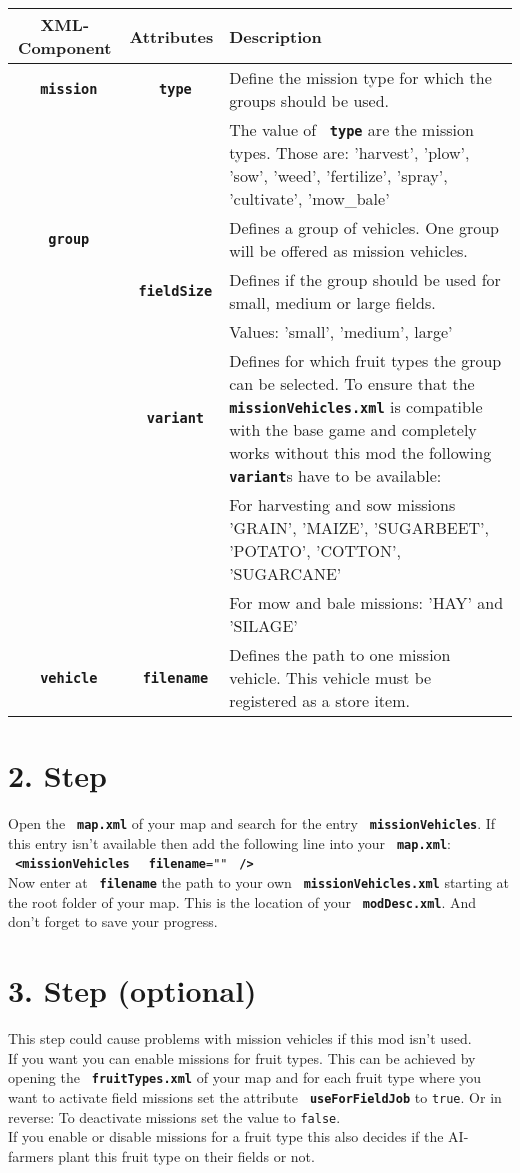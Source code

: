 \documentclass[a4paper]{scrartcl}
\newcommand{\XML}[1]{\texttt{\textbf{\color{pblue} #1}}}
\newcommand{\Attr}[1]{\texttt{\textbf{\color{pgreen} #1}}}
\newcommand{\Datei}[1]{\texttt{\textbf{\color{datei} #1}}}
\newcommand{\icon}[1]{
	\hspace{-2mm}
	\faIcon[solid]{#1}
	\hspace{-2mm}
}
\newcommand{\warning}{{\color{pred}\icon{exclamation-triangle}}}
\begin{document}
	\begin{tabular}{c|c|p{9cm}}
		\textbf{XML-Component} & \textbf{Attributes} & \textbf{Description}\\
		\hline
		\XML{mission} & \Attr{type} & Define the mission type for which the groups should be used.\\
		& & The value of \Attr{type} are the mission types. Those are: 'harvest', 'plow', 'sow', 'weed', 'fertilize', 'spray', 'cultivate', 'mow\_bale'\\
		\hline
		\XML{group} & & Defines a group of vehicles. One group will be offered as mission vehicles.\\
		\hdashline
		& \Attr{fieldSize} & Defines if the group should be used for small, medium or large fields.\\
		& & Values: 'small', 'medium', large'\\
		\hdashline
		& \Attr{variant} &
			Defines for which fruit types the group can be selected.
			To ensure that the \Datei{missionVehicles.xml} is compatible with the base game and completely works without this mod the following \XML{variant}s have to be available:\\
		& & For harvesting and sow missions 'GRAIN', 'MAIZE', 'SUGARBEET', 'POTATO', 'COTTON', 'SUGARCANE'\\
		& & For mow and bale missions: 'HAY' and 'SILAGE'\\
		\hline
		\XML{vehicle} & \Attr{filename} & Defines the path to one mission vehicle. This vehicle must be registered as a store item.
	\end{tabular}

	\section*{2. Step}
	Open the \Datei{map.xml} of your map and search for the entry \XML{missionVehicles}. If this entry isn't available then add the following line into your \Datei{map.xml}:\\
	\XML{<missionVehicles } \Attr{filename}\texttt{="}\texttt{"} \XML{/>}\\
	Now enter at \Attr{filename} the path to your own \Datei{missionVehicles.xml} starting at the root folder of your map. This is the location of your \Datei{modDesc.xml}. And don't forget to save your progress.

	\section*{3. Step (optional)}
	\warning This step could cause problems with mission vehicles if this mod isn't used.\\
	If you want you can enable missions for fruit types. This can be achieved by opening the \Datei{fruitTypes.xml} of your map and for each fruit type where you want to activate field missions set the attribute \Attr{useForFieldJob} to \texttt{true}. Or in reverse: To deactivate missions set the value to \texttt{false}.\\
	If you enable or disable missions for a fruit type this also decides if the AI-farmers plant this fruit type on their fields or not.
\end{document}
